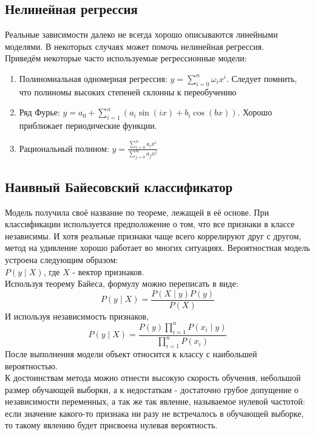 \documentclass{article}
\begin{document}
        
    \subsection*{Нелинейная регрессия}
        Реальные зависимости далеко не всегда хорошо описываются линейными моделями. В некоторых случаях может помочь нелинейная регрессия. \\
        Приведём некоторые часто используемые регрессионные модели:
        \begin{enumerate}
            \item Полиномиальная одномерная регрессия: $y = \sum\limits_{i = 0}^n \omega_i x^i$. Следует помнить, что полиномы высоких степеней склонны к переобучению
            \item Ряд Фурье: $y = a_0 + \sum\limits_{i = 1}^n (a_i \sin{(ix)} + b_i \cos{(bx)})$. Хорошо приближает периодические функции.
            \item Рациональный полином: $y = \frac{\sum\limits_{i = 0}^n a_i x^i}{\sum\limits_{j = 0}^m a_j x^j}$
            
        \end{enumerate}
        
    \subsection*{Наивный Байесовский классификатор \citep{rish2001empirical}}
        Модель получила своё название по теореме, лежащей в её основе. При классификации используется предположение о том, что все признаки в классе независимы. И хотя реальные признаки чаще всего коррелируют друг с другом, метод на удивление хорошо работает во многих ситуациях.
        Вероятностная модель устроена следующим образом: \\
        $P(y \;|\; X)$, где $X$ - вектор признаков. \\
        Используя теорему Байеса, формулу можно переписать в виде: \\
        $$P(y \;|\; X) = \frac{P(X \;|\; y)P(y)}{P(X)}$$
        И используя независимость признаков,
        $$P(y \;|\; X) = \frac{P(y)\prod\limits_{i=1}^n P(x_i \;|\; y)}{\prod\limits_{i = 1}^n P(x_i)}$$
        После выполнения модели объект относится к классу с наибольшей вероятностью. \\
        К достоинствам метода можно отнести высокую скорость обучения, небольшой размер обучающей выборки, а к недостаткам - достаточно грубое допущение о независимости переменных, а так же так явление, называемое нулевой частотой: если значение какого-то признака ни разу не встречалось в обучающей выборке, то такому явлению будет присвоена нулевая вероятность.
    
\end{document}

